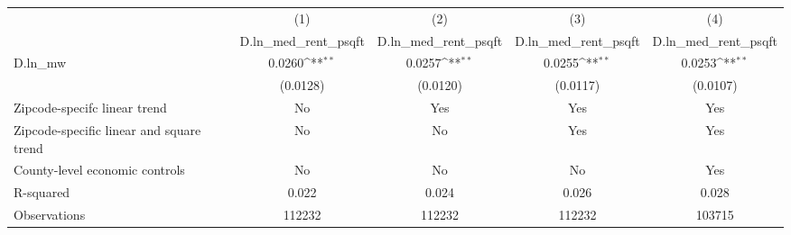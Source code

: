 {
\def\sym#1{\ifmmode^{#1}\else\(^{#1}\)\fi}
\begin{tabular}{l*{4}{c}}
\hline\hline
          &\multicolumn{1}{c}{(1)}&\multicolumn{1}{c}{(2)}&\multicolumn{1}{c}{(3)}&\multicolumn{1}{c}{(4)}\\
          &\multicolumn{1}{c}{D.ln\_med\_rent\_psqft}&\multicolumn{1}{c}{D.ln\_med\_rent\_psqft}&\multicolumn{1}{c}{D.ln\_med\_rent\_psqft}&\multicolumn{1}{c}{D.ln\_med\_rent\_psqft}\\
\hline
D.ln\_mw   &   0.0260\sym{**} &   0.0257\sym{**} &   0.0255\sym{**} &   0.0253\sym{**} \\
          & (0.0128)         & (0.0120)         & (0.0117)         & (0.0107)         \\
\hline
Zipcode-specifc linear trend&       No         &      Yes         &      Yes         &      Yes         \\
Zipcode-specific linear and square trend&       No         &       No         &      Yes         &      Yes         \\
County-level economic controls&       No         &       No         &       No         &      Yes         \\
R-squared &    0.022         &    0.024         &    0.026         &    0.028         \\
Observations&   112232         &   112232         &   112232         &   103715         \\
\hline\hline
\end{tabular}
}

